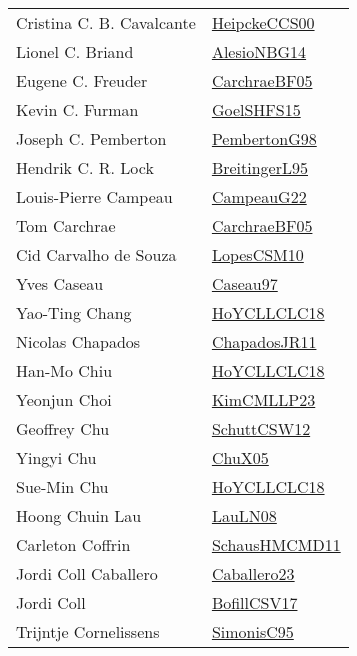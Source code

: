 {\begin{longtable}{p{4cm}p{20cm}}
Cristina C. B. Cavalcante & \href{articles/HeipckeCCS00.pdf}{HeipckeCCS00}\cite{HeipckeCCS00} \\
Lionel C. Briand & \href{papers/AlesioNBG14.pdf}{AlesioNBG14}\cite{AlesioNBG14} \\
Eugene C. Freuder & \href{papers/CarchraeBF05.pdf}{CarchraeBF05}\cite{CarchraeBF05} \\
Kevin C. Furman & \href{articles/GoelSHFS15.pdf}{GoelSHFS15}\cite{GoelSHFS15} \\
Joseph C. Pemberton & \href{papers/PembertonG98.pdf}{PembertonG98}\cite{PembertonG98} \\
Hendrik C. R. Lock & \href{}{BreitingerL95}\cite{BreitingerL95} \\
Louis{-}Pierre Campeau & \href{articles/CampeauG22.pdf}{CampeauG22}\cite{CampeauG22} \\
Tom Carchrae & \href{papers/CarchraeBF05.pdf}{CarchraeBF05}\cite{CarchraeBF05} \\
Cid Carvalho de Souza & \href{articles/LopesCSM10.pdf}{LopesCSM10}\cite{LopesCSM10} \\
Yves Caseau & \href{papers/Caseau97.pdf}{Caseau97}\cite{Caseau97} \\
Yao{-}Ting Chang & \href{papers/HoYCLLCLC18.pdf}{HoYCLLCLC18}\cite{HoYCLLCLC18} \\
Nicolas Chapados & \href{papers/ChapadosJR11.pdf}{ChapadosJR11}\cite{ChapadosJR11} \\
Han{-}Mo Chiu & \href{papers/HoYCLLCLC18.pdf}{HoYCLLCLC18}\cite{HoYCLLCLC18} \\
Yeonjun Choi & \href{papers/KimCMLLP23.pdf}{KimCMLLP23}\cite{KimCMLLP23} \\
Geoffrey Chu & \href{papers/SchuttCSW12.pdf}{SchuttCSW12}\cite{SchuttCSW12} \\
Yingyi Chu & \href{papers/ChuX05.pdf}{ChuX05}\cite{ChuX05} \\
Sue{-}Min Chu & \href{papers/HoYCLLCLC18.pdf}{HoYCLLCLC18}\cite{HoYCLLCLC18} \\
Hoong Chuin Lau & \href{papers/LauLN08.pdf}{LauLN08}\cite{LauLN08} \\
Carleton Coffrin & \href{articles/SchausHMCMD11.pdf}{SchausHMCMD11}\cite{SchausHMCMD11} \\
Jordi Coll Caballero & \href{articles/Caballero23.pdf}{Caballero23}\cite{Caballero23} \\
Jordi Coll & \href{papers/BofillCSV17.pdf}{BofillCSV17}\cite{BofillCSV17} \\
Trijntje Cornelissens & \href{papers/SimonisC95.pdf}{SimonisC95}\cite{SimonisC95} \\

\end{longtable}}
